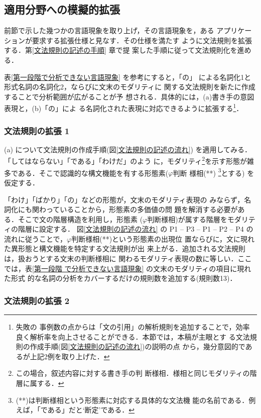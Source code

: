 \subsection{適用分野への模擬的拡張}

前節で示した幾つかの言語現象を取り上げ，その言語現象を，ある
アプリケーションが要求する拡張仕様と見なす．その仕様を満たす
ように文法規則を拡張する．第\ref{文法規則の記述の手順} 章で提
案した手順に従って文法規則化を進める．

表\ref{第一段階で分析できない言語現象} を参考にすると，「の」
による名詞化1と形式名詞の名詞化2，ならびに文末のモダリティに
関する文法規則を新たに作成することで分析範囲が広がることが予
想される．具体的には，(a)書き手の意図表現と，(b)「の」によ
る名詞化された表現に対応できるように拡張する\footnote{失敗の
事例数の点からは「文の引用」の解析規則を追加することで，効率
良く解析率を向上させることができる．本節では，本稿が主眼とす
る文法規則の作成手順(図\ref{文法規則の記述の流れ})の説明の点
から，幾分意図的であるが上記2例を取り上げた．}．

\subsubsection{文法規則の拡張 1}
\label{文法規則の拡張1}

(a) について文法規則の作成手順(図\ref{文法規則の記述の流れ})
を適用してみる．「してはならない」「である」「わけだ」のよう
に，モダリティ\footnote{この場合，叙述内容に対する書き手の判
断様相．様相と同じモダリティの階層に属する．}を示す形態が雑
多である．そこで認識的な構文機能を有する形態素($\varphi$判断
様相(**)
\footnote{(**)は判断様相という形態素に対応する具体的な文法機
能の名前である．例えば，「である」だと`断定'である．}とする)
を仮定する．

「わけ」「ばかり」「の」などの形態が，文末のモダリティ表現の
みならず，名詞化にも関わっていることから，形態素の多価値の問
題を解消する必要がある．そこで文の階層構造を利用し，形態素
($\varphi$判断様相)が属する階層をモダリティの階層に設定する．
図\ref{文法規則の記述の流れ} の P1 -- P3 -- P1 -- P2 -- P4 の
流れに従うことで，$\varphi$判断様相(**)という形態素の出現位
置ならびに，文に現れた異形態と構文機能を特定する文法規則が出
来上がる．追加される文法規則は，扱おうとする文末の判断様相に
関わるモダリティ表現の数に等しい．ここでは，表\ref {第一段階
で分析できない言語現象} の文末のモダリティの項目に現れた形式
的な名詞の分析をカバーするだけの規則数を追加する(規則数13)．

\subsubsection{文法規則の拡張 2}
\label{文法規則の拡張2}

